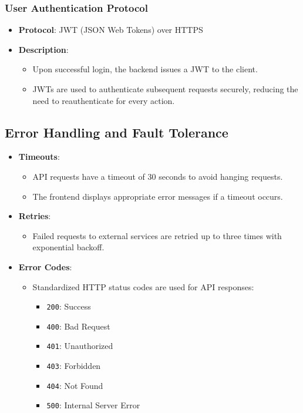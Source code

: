 \documentclass[12pt, titlepage]{article}
\begin{document}
\subsubsection*{User Authentication Protocol}
\begin{itemize}
  \item \textbf{Protocol}: JWT (JSON Web Tokens) over HTTPS
  \item \textbf{Description}:
        \begin{itemize}
          \item Upon successful login, the backend issues a JWT to the client.
          \item JWTs are used to authenticate subsequent requests securely, reducing the need to reauthenticate for every action.
        \end{itemize}
\end{itemize}

\subsection*{Error Handling and Fault Tolerance}
\begin{itemize}
  \item \textbf{Timeouts}:
        \begin{itemize}
          \item API requests have a timeout of 30 seconds to avoid hanging requests.
          \item The frontend displays appropriate error messages if a timeout occurs.
        \end{itemize}
  \item \textbf{Retries}:
        \begin{itemize}
          \item Failed requests to external services are retried up to three times with exponential backoff.
        \end{itemize}
  \item \textbf{Error Codes}:
        \begin{itemize}
          \item Standardized HTTP status codes are used for API responses:
                \begin{itemize}
                  \item \texttt{200}: Success
                  \item \texttt{400}: Bad Request
                  \item \texttt{401}: Unauthorized
                  \item \texttt{403}: Forbidden
                  \item \texttt{404}: Not Found
                  \item \texttt{500}: Internal Server Error
                \end{itemize}
        \end{itemize}
\end{itemize}
\end{document}
